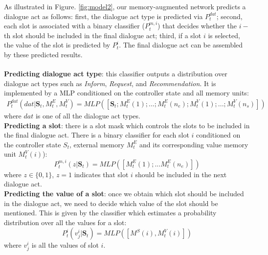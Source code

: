 As illustrated in Figure. \ref{fig:model2}, our memory-augmented network predicts a dialogue act as follows: first, the dialogue act type is predicted via $P_t^{dat}$; second, each slot is associated with a binary classifier ($P_t^{m,i}$) that decides whether the $i-$th slot should be included in the final dialogue act; third, if a slot $i$ is selected, the value of the slot is predicted by $P_t^i$. The final dialogue act can be assembled by these predicted results. 
%
%
\\
    \\ {\bf Predicting dialogue act type}: this classifier outputs a distribution over dialogue act types such as {\em Inform}, {\em Request}, and {\em Recommendation}.
    It is implemented by a MLP conditioned on the controller state and all memory units:
    \begin{align}
    \label{predict:dat}
        P_t^{dat}(dat|\bm{S}_t,M_t^E, M_t^V)=MLP([\bm{S}_t;M_t^E(1);...;M_t^E(n_e);M_t^V(1);...;M_t^V(n_s)])
    \end{align}
    where $dat$ is one of all the dialogue act types.
%
%
    \\ {\bf Predicting a slot}: there is a slot mask which controls the slots to be included in the final dialogue act.
    There is a binary classifier for each slot $i$ conditioned on the controller state $S_t$, external memory $M_t^E$ and its corresponding value memory unit $M_t^V(i)$):
    \begin{equation}
    \label{predict:mask}
        P_t^{m,i}(z|\bm{S}_t)=MLP([M_t^E(1);...M_t^E(n_e)])
    \end{equation}
    where $z \in \{0,1\}$, $z=1$ indicates that slot $i$ should be included in the next dialogue act. 
%
    \\ {\bf Predicting the value of a slot}: once we obtain which slot should be included in the dialogue act, we need to decide which value of the slot should be mentioned. This is given by the classifier which estimates a probability distribution over all the values for a slot:
    \begin{equation}
    \label{predict:sv}
        P_t^{i}(v_j^{i}|\bm{S}_t)=MLP([M^S(i), M_t^V(i)])
    \end{equation}
    where $v_j^{i}$ is all the values of slot $i$. %
%  
%   

